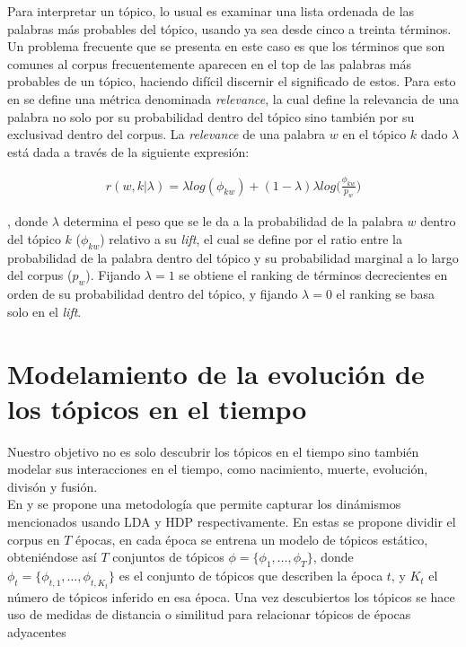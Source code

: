 \documentclass[letterpaper,12pt,oneside]{book} %
\begin{document}
Para interpretar un tópico, lo usual es examinar una lista ordenada de las palabras más probables del tópico, usando ya sea desde cinco a treinta términos. Un problema frecuente que se presenta en este caso es que los términos que son comunes al corpus frecuentemente aparecen en el top de las palabras más probables de un tópico, haciendo difícil discernir el significado de estos.
Para esto en \citep{sievert2014ldavis} se define una métrica denominada \textit{relevance}, la cual define la relevancia de una palabra no solo por su probabilidad dentro del tópico sino también por su exclusivad dentro del corpus. La \textit{relevance} de una palabra $w$ en el tópico $k$ dado $\lambda$ está dada a través de la siguiente expresión:

\begin{align}
    r(w,k|\lambda) = \lambda log (\phi_{kw})+ (1-\lambda)\lambda log\bigg(\frac{\phi_{kw}}{p_{w}}\bigg)
\end{align}

, donde $\lambda$ determina el peso que se le da a la probabilidad de la palabra $w$ dentro del tópico $k$ ($\phi_{kw}$) relativo a su \textit{lift}, el cual se define por el ratio entre la probabilidad de la palabra dentro del tópico y su probabilidad marginal a lo largo del corpus ($p_w$). Fijando $\lambda=1$ se obtiene el ranking de términos decrecientes en orden de su probabilidad dentro del tópico, y fijando $\lambda=0$ el ranking se basa solo en el \textit{lift}.

\section{Modelamiento de la evolución de los tópicos en el tiempo}

Nuestro objetivo no es solo descubrir los tópicos en el tiempo sino también modelar sus interacciones en el tiempo, como nacimiento, muerte, evolución, divisón y fusión.\\ 

En \citep{wilson2011tracking} y \citep{beykikhoshk2018discovering} se propone una metodología que permite capturar los dinámismos mencionados usando LDA y HDP respectivamente. En estas se propone dividir el corpus en $T$ épocas, en cada época se entrena un modelo de tópicos estático, obteniéndose así $T$ conjuntos de tópicos $\phi=\{\phi_{1}, \ldots, \phi_{T}\}$, donde $\phi_{t}=\{\phi_{t,1}, \ldots, \phi_{t,K_{t}}\}$ es el conjunto de tópicos que describen la época $t$, y $K_{t}$ el número de tópicos inferido en esa época. Una vez descubiertos los tópicos se hace uso de medidas de distancia o similitud para relacionar tópicos de épocas adyacentes \\
\end{document}
